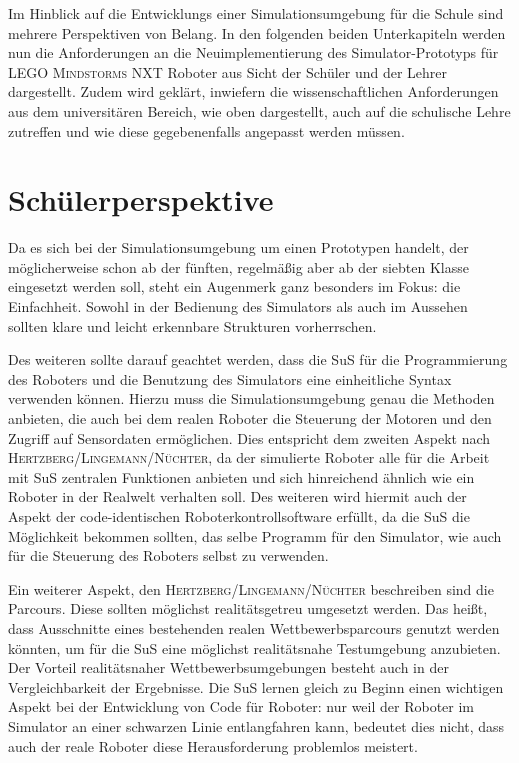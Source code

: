 \documentclass[paper=a4, DIV=calc, BCOR=12mm, twoside=on, onecolumn=on, open = right, titlepage =on, parskip =half-, headsepline = on, footsepline = off, chapterprefix = off, appendixprefix = on, fontsize = 12pt, numbers = noenddot, abstract = on]{scrbook}
\begin{document}
Im Hinblick auf die Entwicklungs einer Simulationsumgebung für die Schule sind mehrere Perspektiven von Belang. 
In den folgenden beiden Unterkapiteln werden nun die Anforderungen an die Neuimplementierung des Simulator-Prototyps für \textsc{LEGO Mindstorms} NXT Roboter aus Sicht der Schüler und der Lehrer dargestellt. Zudem wird geklärt, inwiefern die wissenschaftlichen Anforderungen aus dem universitären Bereich, wie oben dargestellt, auch auf die schulische Lehre zutreffen und wie diese gegebenenfalls angepasst werden müssen.
\vspace*{-1ex}
\par \singlespacing
\section{Schülerperspektive}
\label{sec:schüler}
\onehalfspacing

Da es sich bei der Simulationsumgebung um einen Prototypen handelt, der möglicherweise schon ab der fünften, regelmäßig aber ab der siebten Klasse eingesetzt werden soll, steht ein Augenmerk ganz besonders im Fokus: die Einfachheit. Sowohl in der Bedienung des Simulators als auch im Aussehen sollten klare und leicht erkennbare Strukturen vorherrschen.

Des weiteren sollte darauf geachtet werden, dass die SuS für die Programmierung des Roboters und die Benutzung des Simulators eine einheitliche Syntax verwenden können. Hierzu muss die Simulationsumgebung genau die Methoden anbieten, die auch bei dem realen Roboter die Steuerung der Motoren und den Zugriff auf Sensordaten ermöglichen. Dies entspricht dem zweiten Aspekt nach \textsc{Hertz\-berg\-/\-Lin\-ge\-mann\-/Nüch\-ter}, da der simulierte Roboter alle für die Arbeit mit SuS zentralen Funktionen anbieten und sich hinreichend ähnlich wie ein Roboter in der Realwelt verhalten soll. Des weiteren wird hiermit auch der Aspekt der code-identischen Roboterkontrollsoftware erfüllt, da die SuS die Möglichkeit bekommen sollten, das selbe Programm für den Simulator, wie auch für die Steuerung des Roboters selbst zu verwenden.

Ein weiterer Aspekt, den \textsc{Hertz\-berg\-/\-Lin\-ge\-mann\-/Nüch\-ter} beschreiben sind die Parcours. Diese sollten möglichst realitätsgetreu umgesetzt werden. Das heißt, dass Ausschnitte eines bestehenden realen Wettbewerbsparcours genutzt werden könnten, um für die SuS eine möglichst realitätsnahe Testumgebung anzubieten. Der Vorteil realitätsnaher Wettbewerbsumgebungen besteht auch in der Vergleichbarkeit der Ergebnisse. Die SuS lernen gleich zu Beginn einen wichtigen Aspekt bei der Entwicklung von Code für Roboter: nur weil der Roboter im Simulator an einer schwarzen Linie entlangfahren kann, bedeutet dies nicht, dass auch der reale Roboter diese Herausforderung problemlos meistert.
\end{document}
